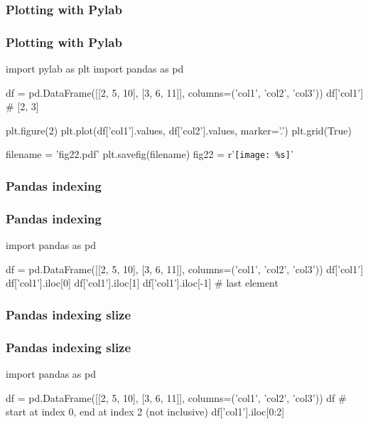 \documentclass[12pt]{beamer}
\begin{document}
\begin{frame}[fragile]
\end{frame}

\subsubsection{Plotting with Pylab}
\begin{frame}[fragile]
\frametitle{Plotting with Pylab}
\begin{pyblock}
import pylab as plt
import pandas as pd

df = pd.DataFrame([[2, 5, 10], [3, 6, 11]], 
			columns=('col1', 'col2', 'col3'))
df['col1'] #  [2, 3]

plt.figure(2)
plt.plot(df['col1'].values, df['col2'].values,
	marker='.')
plt.grid(True)
\end{pyblock}
\begin{pycode}

filename = 'fig22.pdf'
plt.savefig(filename)
fig22 = r'\texttt{[image: \%s]}' %
\end{pycode}
\end{frame}

\begin{frame}[fragile]
\end{frame}

\subsubsection{Pandas indexing}
\begin{frame}[fragile]
\frametitle{Pandas indexing}
\begin{pyconsole}
import pandas as pd

df = pd.DataFrame([[2, 5, 10], [3, 6, 11]], 
			columns=('col1', 'col2', 'col3'))
df['col1']
df['col1'].iloc[0]
df['col1'].iloc[1]
df['col1'].iloc[-1] # last element
\end{pyconsole}
\end{frame}

\subsubsection{Pandas indexing slize}
\begin{frame}[fragile]
\frametitle{Pandas indexing slize}
\begin{pyconsole}
import pandas as pd

df = pd.DataFrame([[2, 5, 10], [3, 6, 11]], 
			columns=('col1', 'col2', 'col3'))
df
# start at index 0, end at index 2 (not inclusive)
df['col1'].iloc[0:2] 
\end{pyconsole}
\end{frame}
\end{document}
